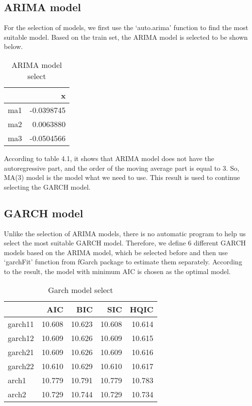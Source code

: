 \documentclass{monashthesis}
\theoremstyle{definition}
\theoremstyle{definition}
\theoremstyle{definition}
\theoremstyle{remark}
\begin{document}
\subsection{ARIMA model}\label{arima-model}

For the selection of models, we first use the `auto.arima' function to
find the most suitable model. Based on the train set, the ARIMA model is
selected to be shown below.

\begin{table}

\caption{\label{tab:arima}ARIMA model select}
\centering
\begin{tabular}[t]{lr}
\toprule
  & x\\
\midrule
ma1 & -0.0398745\\
ma2 & 0.0063880\\
ma3 & -0.0504566\\
\bottomrule
\end{tabular}
\end{table}

According to table 4.1, it shows that ARIMA model does not have the
autoregressive part, and the order of the moving average part is equal
to 3. So, MA(3) model is the model what we need to use. This result is
used to continue selecting the GARCH model.

\subsection{GARCH model}\label{garch-model}

Unlike the selection of ARIMA models, there is no automatic program to
help us select the most suitable GARCH model. Therefore, we define 6
different GARCH models based on the ARIMA model, which be selected
before and then use `garchFit' function from fGarch package to estimate
them separately. According to the result, the model with minimum AIC is
chosen as the optimal model.

\begin{table}

\caption{\label{tab:table1}Garch model select}
\centering
\begin{tabular}[t]{lrrrr}
\toprule
  & AIC & BIC & SIC & HQIC\\
\midrule
garch11 & 10.608 & 10.623 & 10.608 & 10.614\\
garch12 & 10.609 & 10.626 & 10.609 & 10.615\\
garch21 & 10.609 & 10.626 & 10.609 & 10.616\\
garch22 & 10.610 & 10.629 & 10.610 & 10.617\\
arch1 & 10.779 & 10.791 & 10.779 & 10.783\\
arch2 & 10.729 & 10.744 & 10.729 & 10.734\\
\bottomrule
\end{tabular}
\end{table}
\end{document}
